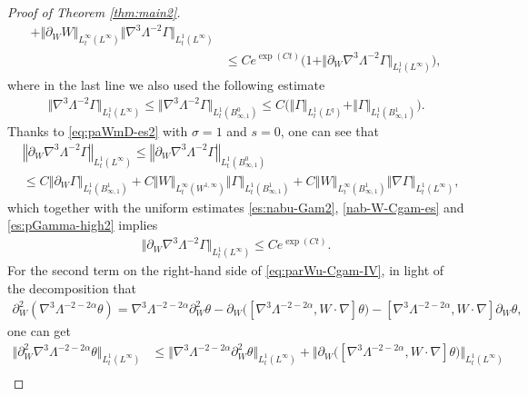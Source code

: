 \documentclass[reqno,11pt,a4paper]{amsart}
\def \p {\partial}
\begin{document}
\begin{proof}[Proof of Theorem \ref{thm:main2}]
\begin{align*}
  + \Vert \p_W W\Vert _{L^\infty_t(L^\infty)} 
  \Vert \nabla^3 \Lambda^{-2} \Gamma\Vert _{L^1_t(L^\infty)} \\
  & \leq C e^{\exp(Ct)} \big(1+ \Vert \p_W \nabla^3\Lambda^{-2} \Gamma\Vert _{L^1_t(L^\infty)}  \big),
\end{align*}
where in the last line we also used the following estimate
\begin{align}\label{es:mDGamma}
  \Vert \nabla^3\Lambda^{-2} \Gamma\Vert _{L^1_t(L^\infty)} 
  \leq \Vert \nabla^3\Lambda^{-2} \Gamma\Vert _{L^1_t(B^0_{\infty,1})}
  \leq C\big(\Vert \Gamma\Vert _{L^1_t(L^q)}+ \Vert \Gamma\Vert _{L^1_t(B^1_{\infty,1})}\big).
\end{align}
Thanks to \eqref{eq:paWmD-es2} with $\sigma=1$ and $s=0$, one can see that
\begin{align*}
  & \left\Vert \p_W\nabla^3 \Lambda^{-2} \Gamma\right\Vert _{L^1_t(L^\infty)} 
  \leq \left\Vert \p_W\nabla^3\Lambda^{-2} \Gamma\right\Vert _{L^1_t(B^0_{\infty,1})} \\
  & \leq C\left\Vert  \p_W \Gamma\right\Vert _{L^1_t(B^1_{\infty,1})} 
  + C \Vert W\Vert _{L^\infty_t(W^{1,\infty})} \left\Vert \Gamma\right\Vert _{L^1_t(B^1_{\infty,1})} 
  + C \left\Vert   W\right\Vert _{L^\infty_t(B^1_{\infty,1})} \left\Vert \nabla\Gamma\right\Vert _{L^1_t(L^\infty)},
\end{align*}
which together with the uniform estimates \eqref{es:nabu-Gam2}, \eqref{nab-W-Cgam-es} 
and \eqref{es:pGamma-high2} implies
\begin{align*}
  \Vert \partial_W \nabla^3 \Lambda^{-2}\Gamma\Vert _{L^1_t(L^\infty)} 
  \leq C e^{\exp(Ct)}.
\end{align*}
For the second term on the right-hand side of \eqref{eq:parWu-Cgam-IV}, in light of the decomposition that  
\begin{align*}
  \p_W^2(\nabla^3\Lambda^{-2-2\alpha} \theta) 
  = \nabla^3\Lambda^{-2-2\alpha} \p_W^2\theta
  -\p_W \big([\nabla^3\Lambda^{-2-2\alpha}, W\cdot\nabla]\theta\big) 
  - [\nabla^3\Lambda^{-2-2\alpha}, W\cdot\nabla]\p_W\theta,
\end{align*} 
one can get 
\begin{align*}
  \big\Vert \partial^2_W \nabla^3\Lambda^{-2-2\alpha} \theta \big\Vert _{L^1_t(L^\infty)}
  & \leq \Vert \nabla^3\Lambda^{-2-2\alpha} \p_W^2\theta\Vert _{L_t^1(L^\infty)} 
  + \big\Vert \p_W\big([\nabla^3\Lambda^{-2-2\alpha}, W\cdot\nabla]\theta\big)\big\Vert _{L_t^1(L^\infty)}\\

\end{align*}
\end{proof}
\end{document}
